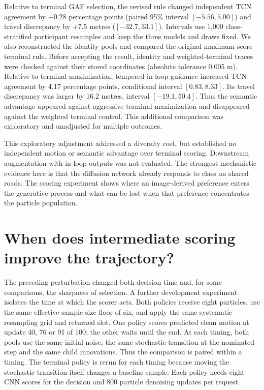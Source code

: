Relative to terminal GAF selection, the revised rule changed independent TCN agreement by $-0.28$ percentage points (paired 95\% interval $[-5.56,5.00]$) and travel discrepancy by $+7.5$ metres ($[-32.7,33.1]$). Intervals use 1,000 class-stratified participant resamples and keep the three models and draws fixed. We also reconstructed the identity pools and compared the original maximum-score terminal rule. Before accepting the result, identity and weighted-terminal traces were checked against their stored coordinates (absolute tolerance 0.005 m). Relative to terminal maximization, tempered in-loop guidance increased TCN agreement by 4.17 percentage points, conditional interval $[0.83,8.33]$. Its travel discrepancy was larger by 16.2 metres, interval $[-19.1,50.4]$. Thus the semantic advantage appeared against aggressive terminal maximization and disappeared against the weighted terminal control. This additional comparison was exploratory and unadjusted for multiple outcomes.

This exploratory adjustment addressed a diversity cost, but established no independent motion or semantic advantage over terminal scoring. Downstream augmentation with in-loop outputs was not evaluated. The strongest mechanistic evidence here is that the diffusion network already responds to class on shared roads. The scoring experiment shows where an image-derived preference enters the generative process and what can be lost when that preference concentrates the particle population.

\section{When does intermediate scoring improve the trajectory?}
The preceding perturbation changed both decision time and, for some comparisons, the sharpness of selection. A further development experiment isolates the time at which the scorer acts. Both policies receive eight particles, use the same effective-sample-size floor of six, and apply the same systematic resampling grid and returned slot. One policy scores predicted clean motion at update 40, 76 or 91 of 100; the other waits until the end. At each timing, both pools use the same initial noise, the same stochastic transition at the nominated step and the same child innovations. Thus the comparison is paired within a timing. The terminal policy is rerun for each timing because moving the stochastic transition itself changes a baseline sample. Each policy needs eight CNN scores for the decision and 800 particle denoising updates per request.

